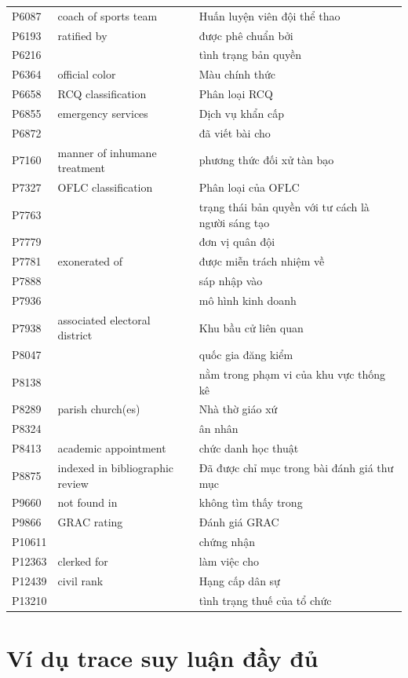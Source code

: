 \begin{center}
\begin{longtable}{p{1.6cm} p{5.2cm} p{5.2cm}}
P6087 & coach of sports team & Huấn luyện viên đội thể thao \\
P6193 & ratified by & được phê chuẩn bởi \\
P6216 &  & tình trạng bản quyền \\
P6364 & official color & Màu chính thức \\
P6658 & RCQ classification & Phân loại RCQ \\
P6855 & emergency services & Dịch vụ khẩn cấp \\
P6872 &  & đã viết bài cho \\
P7160 & manner of inhumane treatment & phương thức đối xử tàn bạo \\
P7327 & OFLC classification & Phân loại của OFLC \\
P7763 &  & trạng thái bản quyền với tư cách là người sáng tạo \\
P7779 &  & đơn vị quân đội \\
P7781 & exonerated of & được miễn trách nhiệm về \\
P7888 &  & sáp nhập vào \\
P7936 &  & mô hình kinh doanh \\
P7938 & associated electoral district & Khu bầu cử liên quan \\
P8047 &  & quốc gia đăng kiểm \\
P8138 &  & nằm trong phạm vi của khu vực thống kê \\
P8289 & parish church(es) & Nhà thờ giáo xứ \\
P8324 &  & ân nhân \\
P8413 & academic appointment & chức danh học thuật \\
P8875 & indexed in bibliographic review & Đã được chỉ mục trong bài đánh giá thư mục \\
P9660 & not found in & không tìm thấy trong \\
P9866 & GRAC rating & Đánh giá GRAC \\
P10611 &  & chứng nhận \\
P12363 & clerked for & làm việc cho \\
P12439 & civil rank & Hạng cấp dân sự \\
P13210 &  & tình trạng thuế của tổ chức \\
\end{longtable}
\end{center}

\section{Ví dụ trace suy luận đầy đủ}
